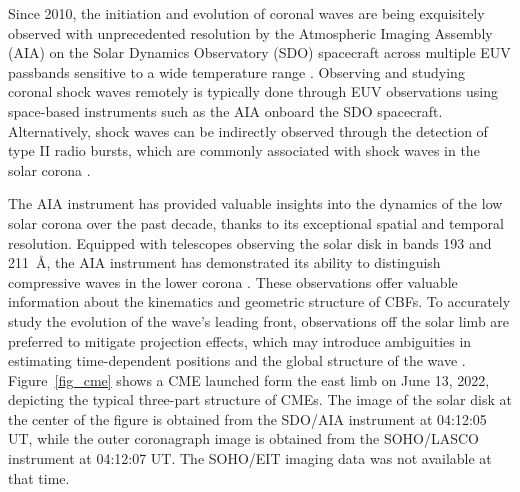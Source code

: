 Since 2010, the initiation and evolution of coronal waves are being exquisitely observed with unprecedented resolution by the Atmospheric Imaging Assembly (AIA) on the Solar Dynamics Observatory (SDO) spacecraft \citep{lemen_2012} across multiple EUV passbands sensitive to a wide temperature range \citep{nitta_2013}.
Observing and studying coronal shock waves remotely is typically done through EUV observations using space-based instruments such as the AIA onboard the SDO spacecraft. Alternatively, shock waves can be indirectly observed through the detection of type II radio bursts, which are commonly associated with shock waves in the solar corona \citep{vrsnak_2008}.

The AIA instrument has provided valuable insights into the dynamics of the low solar corona over the past decade, thanks to its exceptional spatial and temporal resolution. Equipped with telescopes observing the solar disk in bands 193 and 211~\AA, the AIA instrument has demonstrated its ability to distinguish compressive waves in the lower corona \citep{patsourakos_2010, ma_2011, kozarev_2011}. These observations offer valuable information about the kinematics and geometric structure of CBFs. To accurately study the evolution of the wave's leading front, observations off the solar limb are preferred to mitigate projection effects, which may introduce ambiguities in estimating time-dependent positions and the global structure of the wave \citep{kozarev_2015}.
Figure~\ref{fig_cme} shows a CME launched form the east limb on June 13, 2022, depicting the typical three-part structure of CMEs. The image of the solar disk at the center of the figure is obtained from the SDO/AIA instrument at 04:12:05 UT, while the outer coronagraph image is obtained from the SOHO/LASCO instrument at 04:12:07 UT. The SOHO/EIT imaging data was not available at that time.


